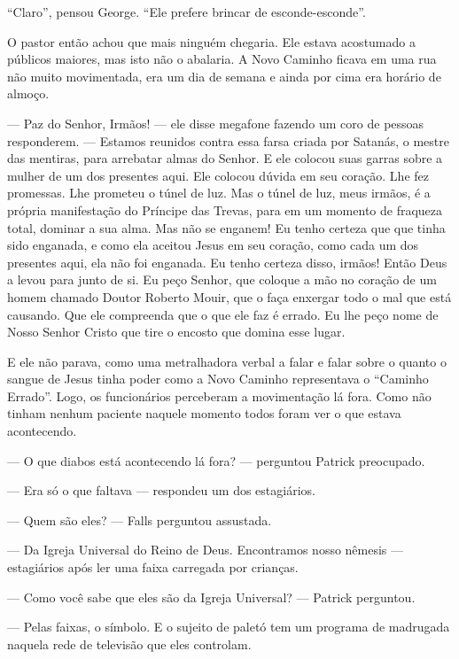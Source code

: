 ``Claro'', pensou George. ``Ele prefere brincar de esconde-esconde''.

O pastor então achou que mais ninguém chegaria. Ele estava acostumado a públicos maiores, mas isto não o abalaria. A Novo Caminho ficava em uma rua não muito movimentada, era um dia de semana e ainda por cima era horário de almoço.

--- Paz do Senhor, Irmãos! --- ele disse  megafone\mudanca{,} fazendo um coro de pessoas responderem. --- Estamos reunidos contra essa farsa criada por Satanás, o mestre das mentiras, para arrebatar almas do Senhor. E ele colocou suas garras sobre a mulher de um dos presentes aqui. Ele colocou dúvida em seu coração. Lhe fez promessas. Lhe prometeu o túnel de luz. Mas o túnel de luz, meus irmãos, é a própria manifestação do Príncipe das Trevas, para\mudanca{,} em um momento de fraqueza total, dominar a sua alma. Mas não se enganem! Eu tenho certeza que  que tinha sido enganada, e como ela aceitou Jesus em seu coração, como cada um dos presentes aqui, ela não foi enganada. Eu tenho certeza disso, irmãos! Então Deus a levou para junto de si. Eu peço Senhor, que coloque a mão no coração de um homem chamado Doutor Roberto Mouir, que o faça enxergar todo o mal que está causando. Que ele compreenda que o que ele faz é errado. Eu lhe peço nome de Nosso Senhor Cristo\mudanca{,} que tire o encosto que domina esse lugar.

E ele não parava, como uma metralhadora verbal  a falar e falar sobre o quanto o sangue de Jesus tinha poder como a Novo Caminho representava o ``Caminho Errado''. Logo, os funcionários perceberam a movimentação lá fora. Como não tinham nenhum paciente naquele momento\mudanca{,} todos foram ver o que estava acontecendo.

--- O que diabos está acontecendo lá fora? --- perguntou Patrick\mudanca{,} preocupado.

--- Era só o que faltava --- respondeu um dos estagiários.

--- Quem são eles? --- Falls perguntou\mudanca{,} assustada.

--- Da Igreja Universal do Reino de Deus. Encontramos nosso nêmesis ---  estagiários\mudanca{,} após ler uma faixa carregada por crianças.

--- Como você sabe que eles são da Igreja Universal? --- Patrick perguntou.

--- Pelas faixas, o símbolo. E o sujeito de paletó tem um programa de madrugada naquela rede de televisão que eles controlam.

